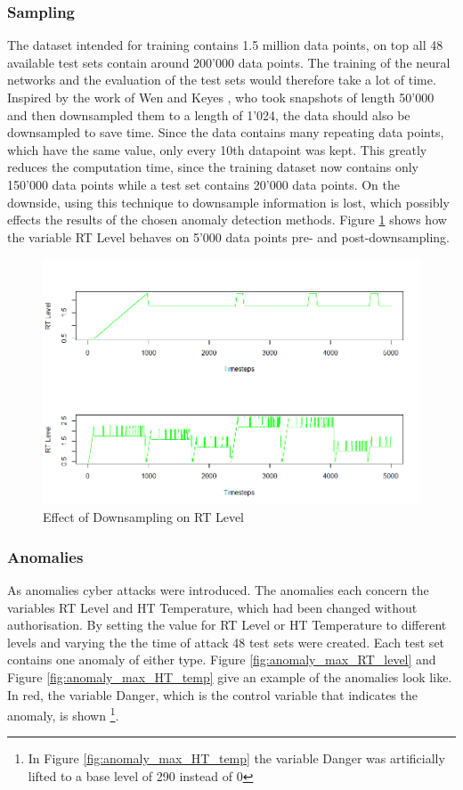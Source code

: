 \subsubsection{Sampling}
The dataset intended for training contains 1.5 million data points, on top all 48 available test sets contain around 200'000 data points. The training of the neural networks and the evaluation of the test sets would therefore take a lot of time. Inspired by the work of Wen and Keyes \parencite*{Wen2019}, who took snapshots of length 50'000 and then downsampled them to a length of 1'024, the data should also be downsampled to save time. Since the data contains many repeating data points, which have the same value, only every 10th datapoint was kept. This greatly reduces the computation time, since the training dataset now contains only 150'000 data points while a test set contains 20'000 data points. On the downside, using this technique to downsample information is lost, which possibly effects the results of the chosen anomaly detection methods. Figure \ref{fig:downsample} shows how the variable RT Level behaves on 5'000 data points pre- and post-downsampling.

\begin{figure}[h]
	\centering
	\includegraphics[scale=0.6]{Figures/downsample}
	\decoRule
	\caption[Effect of Downsampling]{Effect of Downsampling on RT Level \parencite{Own}}
	\label{fig:downsample}
\end{figure}

\newpage
\subsubsection{Anomalies}
As anomalies cyber attacks were introduced. The anomalies each concern the variables RT Level and HT Temperature, which had been changed without authorisation. By setting the value for RT Level or HT Temperature to different levels and varying the the time of attack 48 test sets were created. Each test set contains one anomaly of either type. Figure \ref{fig:anomaly_max_RT_level} and Figure \ref{fig:anomaly_max_HT_temp} give an example of the anomalies look like. In red, the variable Danger, which is the control variable that indicates the anomaly, is shown \footnote{In Figure \ref{fig:anomaly_max_HT_temp} the variable Danger was artificially lifted to a base level of 290 instead of 0}.

